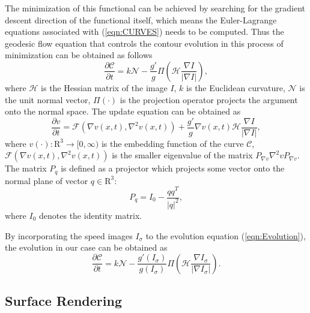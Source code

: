 The minimization of this functional can be achieved by searching for the gradient descent direction of the functional itself, which means the Euler-Lagrange equations associated with (\ref{eqn:CURVES}) needs to be computed. %
Thus the geodesic flow equation that controls the contour evolution in this process of minimization can be obtained as follows
\begin{equation}
\label{eqn:Evolution}
\frac{\partial \mathcal{C}}{\partial t} = k \mathcal{N} - \frac{g'}{g} \varPi \left( \mathcal{H} \frac{\nabla I}{ \left| \nabla I \right| } \right),
\end{equation}
where $\mathcal{H}$ is the Hessian matrix of the image $I$, $k$ is the Euclidean curvature, $\mathcal{N}$ is the unit normal vector, $\varPi(\cdot)$ is the projection operator projects the argument onto the normal space. %
The update equation can be obtained as
\begin{equation}
\label{eqn:Update}
\frac{\partial v}{\partial t} = \mathcal{F} \left( \nabla v(x, t), \nabla^2 v(x, t) \right) + \frac{g'}{g} \nabla v(x, t) \mathcal{H} \frac{\nabla I}{ \left| \nabla I \right| },
\end{equation}
where $v(\cdot): \mathrm{R}^3 \rightarrow [0, \infty)$ is the embedding function of the curve $\mathcal{C}$, $\mathcal{F} \left( \nabla v(x, t), \nabla^2 v(x, t) \right)$ is the smaller eigenvalue of the matrix $P_{\nabla v} \nabla^2 v P_{\nabla v}$. %
The matrix $P_q$ is defined as a projector which projects some vector onto the normal plane of vector $q \in \mathrm{R}^3$:
\begin{equation}
\label{eqn:ProjectionOperator}
P_q = I_0 - \frac{qq^T}{\left| q \right|^2},
\end{equation}
where $I_0$ denotes the identity matrix.

By incorporating the speed images $I_{\sigma}$ to the evolution equation (\ref{eqn:Evolution}), the evolution in our case can be obtained as
\begin{equation}
\label{eqn:Application}
\frac{\partial \mathcal{C}}{\partial t} = k \mathcal{N} - \frac{g'(I_{\sigma})}{g(I_{\sigma})} \varPi \left( \mathcal{H} \frac{\nabla I_{\sigma}}{ \left| \nabla I_{\sigma} \right| } \right).%
\end{equation}

\subsection{Surface Rendering}

